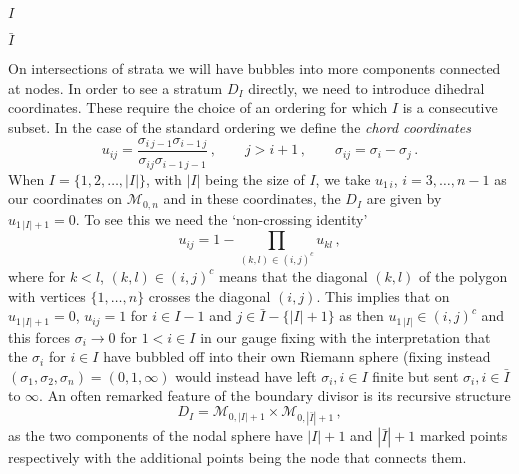 \documentclass[11pt]{article}
\newcommand{\cM}{\mathcal{M}}
\newcommand{\1}{{\rm 1\hskip-0.25em I}}
\begin{document}
\begin{center}

$I$\qquad{} \qquad $\bar I$\end{center}

On intersections of strata we will have bubbles into more components connected at nodes. In order to see a stratum $D_I$ directly, we need to introduce dihedral coordinates. These require the choice of an ordering for which $I$ is a consecutive subset.  In the case of the standard ordering we define the \emph{chord coordinates}
\begin{equation}
u_{ij}=\frac{\sigma_{i\,j-1}\sigma_{i-1\, j}}{\sigma_{ij}\sigma_{i-1\, j-1}}\, , \qquad j>i+1\, ,\qquad \sigma_{ij}=\sigma_i-\sigma_j\, .
\end{equation}
When $I=\{1,2,\ldots ,|I|\}$, with $|I|$ being the size of $I$, we take  $u_{1\, i}$, $i=3,\ldots,n-1$ as our coordinates on  $\cM_{0,n}$ and in these coordinates, the $D_I$ are given by $u_{1\,|I|+1}=0$.  To see this we need the `non-crossing identity'
\begin{equation}
u_{ij}=1-\prod_{(k,l)\in (i,j)^c} u_{kl}\, , \label{non-cross}
\end{equation}
where for $k<l$, $(k,l)\in (i,j)^c$ means that the diagonal $(k,l)$ of the polygon with vertices $\{1,\ldots,n\}$ crosses the diagonal $(i,j)$.  This implies that on $u_{1\, |I|+1}=0$, $u_{ij}=1$ for $i\in I-1$ and $j\in \bar I-\{|I|+1\}$ as then $u_{1\,|I|}\in (i,j)^c$ and this forces $\sigma_{i}\rightarrow 0$ for $1<i\in I$ in our gauge fixing with the interpretation that the $\sigma_i$ for $i\in I$ have bubbled off into their own Riemann sphere (fixing instead $(\sigma_1,\sigma_2,\sigma_n)=(0,1,\infty)$ would instead have left $\sigma_i, i\in I$ finite but sent $\sigma_i, i\in \bar I$ to $\infty$.
An often remarked  feature of the boundary divisor is its recursive structure
\begin{equation}
 D_I=\cM_{0,|I|+1}\times \cM_{0,|\bar I|+1}\, ,
\end{equation}
as the two components of the nodal sphere have $|I|+1$ and $|\bar I|+1$ marked points respectively with the additional points being the node that connects them.   
\end{document}
